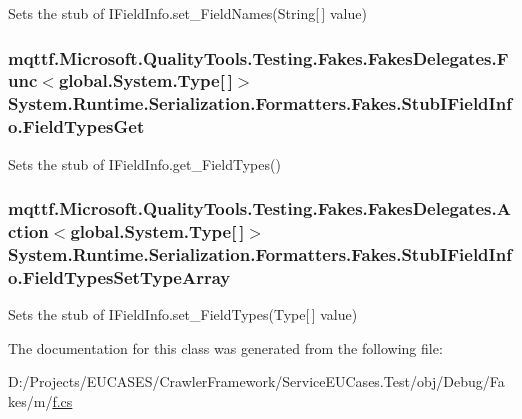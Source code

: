 Sets the stub of I\-Field\-Info.\-set\-\_\-\-Field\-Names(\-String\mbox{[}$\,$\mbox{]} value)

\hypertarget{class_system_1_1_runtime_1_1_serialization_1_1_formatters_1_1_fakes_1_1_stub_i_field_info_a9dafda811de018bdf1eb1ae0d7ff5893}{
\subsubsection[{Field\-Types\-Get}]{\setlength{\rightskip}{0pt plus 5cm}mqttf.\-Microsoft.\-Quality\-Tools.\-Testing.\-Fakes.\-Fakes\-Delegates.\-Func$<$global.\-System.\-Type\mbox{[}$\,$\mbox{]}$>$ System.\-Runtime.\-Serialization.\-Formatters.\-Fakes.\-Stub\-I\-Field\-Info.\-Field\-Types\-Get}}\label{class_system_1_1_runtime_1_1_serialization_1_1_formatters_1_1_fakes_1_1_stub_i_field_info_a9dafda811de018bdf1eb1ae0d7ff5893}


Sets the stub of I\-Field\-Info.\-get\-\_\-\-Field\-Types()

\hypertarget{class_system_1_1_runtime_1_1_serialization_1_1_formatters_1_1_fakes_1_1_stub_i_field_info_a0fdbe46757c4f0c242f6c6c2aa5423a9}{
\subsubsection[{Field\-Types\-Set\-Type\-Array}]{\setlength{\rightskip}{0pt plus 5cm}mqttf.\-Microsoft.\-Quality\-Tools.\-Testing.\-Fakes.\-Fakes\-Delegates.\-Action$<$global.\-System.\-Type\mbox{[}$\,$\mbox{]}$>$ System.\-Runtime.\-Serialization.\-Formatters.\-Fakes.\-Stub\-I\-Field\-Info.\-Field\-Types\-Set\-Type\-Array}}\label{class_system_1_1_runtime_1_1_serialization_1_1_formatters_1_1_fakes_1_1_stub_i_field_info_a0fdbe46757c4f0c242f6c6c2aa5423a9}


Sets the stub of I\-Field\-Info.\-set\-\_\-\-Field\-Types(\-Type\mbox{[}$\,$\mbox{]} value)



The documentation for this class was generated from the following file\-:\begin{DoxyCompactItemize}
\item 
D\-:/\-Projects/\-E\-U\-C\-A\-S\-E\-S/\-Crawler\-Framework/\-Service\-E\-U\-Cases.\-Test/obj/\-Debug/\-Fakes/m/\hyperlink{m_2f_8cs}{f.\-cs}\end{DoxyCompactItemize}
